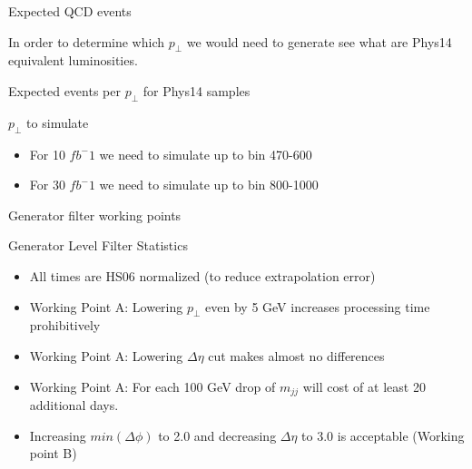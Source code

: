 \documentclass[8pt]{beamer}
\begin{document}
\begin{frame}{Expected QCD events}

In order to determine which $p_\perp$ we would need to generate see what are Phys14 equivalent luminosities.

\begin{block}{Expected events per $p_\perp$ for Phys14 samples}



\end{block}

\begin{block}{$p_\perp$ to simulate}

\begin{itemize}
  \item For 10 $fb^-1$ we need to simulate up to bin 470-600
  \item For 30 $fb^-1$ we need to simulate up to bin 800-1000
\end{itemize}

\end{block}

\end{frame}

\begin{frame}{Generator filter working points}
  
\begin{block}{Generator Level Filter Statistics}

  \centering
  
  
\end{block}

\begin{itemize}
  \item All times are HS06 normalized (to reduce extrapolation error)
  \item Working Point A: Lowering $p_\perp$ even by 5 GeV increases processing time prohibitively 
  \item Working Point A: Lowering $\Delta\eta$ cut makes almost no differences
  \item Working Point A: For each 100 GeV drop of $m_{jj}$ will cost of at least 20 additional days. 
  \item Increasing $min(\Delta\phi)$ to 2.0 and decreasing $\Delta\eta$ to 3.0 is acceptable (Working point B)
\end{itemize}
  
\end{frame}
\end{document}

